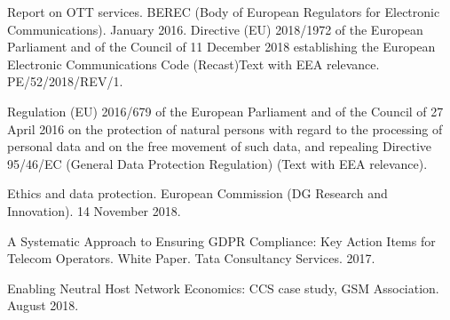 \documentclass[12pt]{amsart}
\begin{document}
\begin{multicols}{2}
\begin{thebibliography}{9}
 Report on OTT services. BEREC (Body of European Regulators for Electronic Communications). January 2016.
 Directive (EU) 2018/1972 of the European
  Parliament and of the Council of 11 December 2018 establishing the
  European Electronic Communications Code (Recast)Text with EEA
  relevance. PE/52/2018/REV/1.

 Regulation (EU) 2016/679 of the European
  Parliament and of the Council of 27 April 2016 on the protection of
  natural persons with regard to the processing of personal data and
  on the free movement of such data, and repealing Directive 95/46/EC
  (General Data Protection Regulation) (Text with EEA relevance).

 Ethics and data protection. European
  Commission (DG Research and Innovation). 14 November 2018.

 A Systematic Approach to Ensuring GDPR
    Compliance: Key Action Items for Telecom Operators. White
    Paper. Tata Consultancy Services. 2017.

 Enabling Neutral Host
Network Economics: CCS case study, GSM Association. August 2018.
\end{thebibliography}
\clearpage


\end{multicols}
\end{document}
